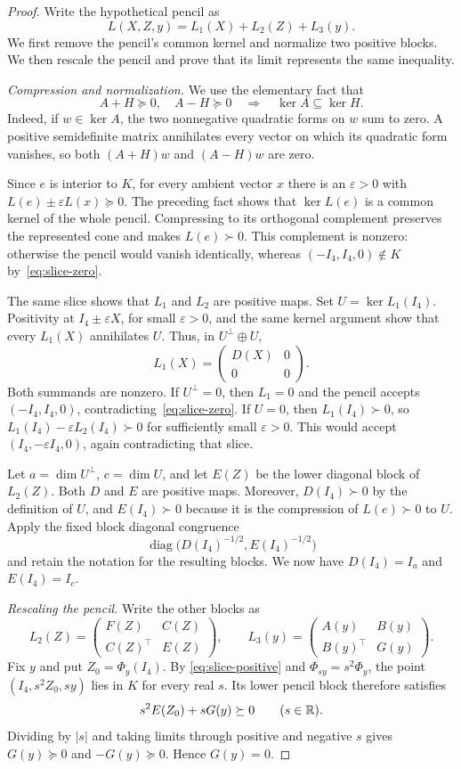 \begin{proof}
Write the hypothetical pencil as
\[
 L(X,Z,y)=L_1(X)+L_2(Z)+L_3(y).
\]
We first remove the pencil's common kernel and normalize
two positive blocks.
We then rescale the pencil and prove that its limit represents the
same inequality.

\emph{Compression and normalization.}
We use the elementary fact that
\[
 A+H\succeq0,\quad A-H\succeq0
 \quad\Longrightarrow\quad \ker A\subseteq\ker H.
\]
Indeed, if $w\in\ker A$, the two nonnegative quadratic forms on $w$
sum to zero.  A positive semidefinite matrix annihilates every vector
on which its quadratic form vanishes, so both $(A+H)w$ and $(A-H)w$
are zero.

Since $e$ is interior to $K$, for every ambient vector $x$ there is
an $\varepsilon>0$ with $L(e)\pm\varepsilon L(x)\succeq0$.
The preceding fact shows that $\ker L(e)$ is a common kernel of the
whole pencil.  Compressing to its orthogonal complement preserves the
represented cone and makes $L(e)\succ0$.  This complement is nonzero:
otherwise the pencil would vanish identically, whereas
$(-I_4,I_4,0)\notin K$ by~\eqref{eq:slice-zero}.

The same slice shows that $L_1$ and $L_2$ are positive maps.  Set
$U=\ker L_1(I_4)$.  Positivity at $I_4\pm\varepsilon X$, for small
$\varepsilon>0$, and the same kernel argument show that every
$L_1(X)$ annihilates $U$.  Thus, in $U^\perp\oplus U$,
\[
 L_1(X)=\begin{pmatrix}D(X)&0\\0&0\end{pmatrix}.
\]
Both summands are nonzero.  If $U^\perp=0$, then $L_1=0$ and the
pencil accepts $(-I_4,I_4,0)$, contradicting~\eqref{eq:slice-zero}.
If $U=0$, then $L_1(I_4)\succ0$, so
$L_1(I_4)-\varepsilon L_2(I_4)\succ0$ for sufficiently small
$\varepsilon>0$.  This would accept $(I_4,-\varepsilon I_4,0)$,
again contradicting that slice.

Let $a=\dim U^\perp$, $c=\dim U$, and let $E(Z)$ be the lower
diagonal block of $L_2(Z)$.  Both $D$ and $E$ are positive maps.
Moreover, $D(I_4)\succ0$ by the definition of $U$, and
$E(I_4)\succ0$ because it is the compression of $L(e)\succ0$ to
$U$.  Apply the fixed block diagonal congruence
\[
 \operatorname{diag}\bigl(D(I_4)^{-1/2},E(I_4)^{-1/2}\bigr)
\]
and retain the notation for the resulting blocks.  We now have
$D(I_4)=I_a$ and $E(I_4)=I_c$.

\emph{Rescaling the pencil.}
Write the other blocks as
\[
 L_2(Z)=\begin{pmatrix}F(Z)&C(Z)\\C(Z)^\top&E(Z)\end{pmatrix},
 \qquad
 L_3(y)=\begin{pmatrix}A(y)&B(y)\\B(y)^\top&G(y)\end{pmatrix}.
\]
Fix $y$ and put $Z_0=\Phi_y(I_4)$.  By
\eqref{eq:slice-positive} and $\Phi_{sy}=s^2\Phi_y$, the point
$(I_4,s^2Z_0,sy)$ lies in $K$ for every real $s$.  Its lower pencil
block therefore satisfies
\[
 s^2E(Z_0)+sG(y)\succeq0 \qquad(s\in\mathbb R).
\]
Dividing by $|s|$ and taking limits through positive and negative
$s$ gives $G(y)\succeq0$ and $-G(y)\succeq0$.  Hence $G(y)=0$.


\end{proof}
